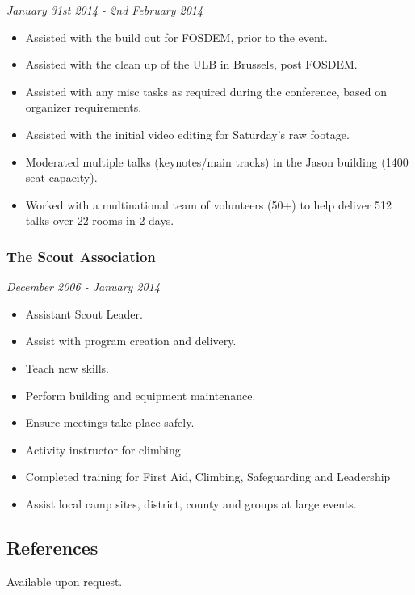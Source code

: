 \emph{January 31st 2014 - 2nd February 2014}

\begin{itemize}
\itemsep1pt\parskip0pt
\item
  Assisted with the build out for FOSDEM, prior to the event.
\item
  Assisted with the clean up of the ULB in Brussels, post FOSDEM.
\item
  Assisted with any misc tasks as required during the conference, based
  on organizer requirements.
\item
  Assisted with the initial video editing for Saturday's raw footage.
\item
  Moderated multiple talks (keynotes/main tracks) in the Jason building
  (1400 seat capacity).
\item
  Worked with a multinational team of volunteers (50+) to help deliver
  512 talks over 22 rooms in 2 days.
\end{itemize}

\subsubsection{The Scout Association}\label{the-scout-association}

\emph{December 2006 - January 2014}

\begin{itemize}
\itemsep1pt\parskip0pt
\item
  Assistant Scout Leader.
\item
  Assist with program creation and delivery.
\item
  Teach new skills.
\item
  Perform building and equipment maintenance.
\item
  Ensure meetings take place safely.
\item
  Activity instructor for climbing.
\item
  Completed training for First Aid, Climbing, Safeguarding and
  Leadership
\item
  Assist local camp sites, district, county and groups at large events.
\end{itemize}

\subsection{References}\label{references}

Available upon request.

